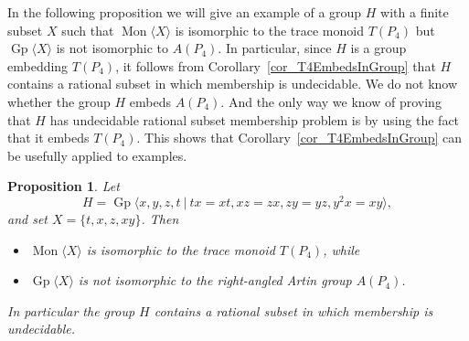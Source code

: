 \documentclass{amsart}
\newcommand{\Mgen}[1]{\operatorname{Mon}\bigl\langle #1 \bigr\rangle}
\newcommand{\Ggen}[1]{\operatorname{Gp}\bigl\langle #1 \bigr\rangle}
\newcommand{\Gpres}[2]{\operatorname{Gp}\bigl\langle #1\:|\:#2 \bigr\rangle}
\theoremstyle{plain}
\newtheorem{prop}[theorem]{Proposition}
\theoremstyle{definition}
\begin{document}
In the following proposition we will give an example of a group $H$ with a finite subset $X$ such that $\Mgen{X}$ is isomorphic to the trace monoid $T(P_4)$ but $\Ggen{X}$ is not isomorphic to $A(P_4)$. In particular, since $H$ is a group embedding $T(P_4)$, it follows from Corollary~\ref{cor_T4EmbedsInGroup} that $H$ contains a rational subset in which membership is undecidable.  We do not know whether the group $H$ embeds $A(P_4)$. And the only way we know of proving that $H$ has undecidable rational subset membership problem is by using the fact that it embeds $T(P_4)$. This shows that Corollary~\ref{cor_T4EmbedsInGroup} can be usefully applied to examples.   

\begin{prop}\label{prop_traceMonEmbeds} 
Let 
\[
H = \Gpres{x,y,z,t}{tx=xt, xz=zx, zy=yz, y^2x = xy},
\]
and set $X = \{ t,x,z,xy\}$. Then  
\begin{itemize} 
\item[(i)] $\Mgen{X}$ is isomorphic to the trace monoid $T(P_4)$, while 
\item[(ii)] $\Ggen{X}$ is not isomorphic to the right-angled Artin group $A(P_4)$.  
  \end{itemize}
In particular the group $H$ contains a rational subset in which membership is undecidable.    
  \end{prop}
\end{document}
